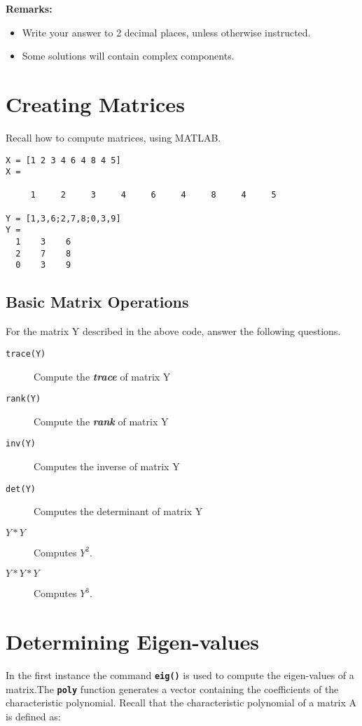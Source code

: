 \documentclass[a4paper,12pt]{article}
\begin{document}
\tableofcontents
\newpage


\textbf{Remarks:}
\begin{itemize}
\item Write your answer to 2 decimal places, unless otherwise instructed.
\item Some solutions will contain complex components.
\end{itemize}


\section{Creating Matrices}
Recall how to compute matrices, using MATLAB.

\begin{framed}
\begin{verbatim}
X = [1 2 3 4 6 4 8 4 5]
X =

     1     2     3     4     6     4     8     4     5

Y = [1,3,6;2,7,8;0,3,9]
Y =
  1    3    6
  2    7    8
  0    3    9

\end{verbatim}
\end{framed}

\subsection{Basic Matrix Operations}

For the matrix Y described in the above code, answer the following questions.
\begin{description}
\item[\texttt{trace(Y)}] Compute the \textbf{\textit{trace}} of matrix Y
\item[\texttt{rank(Y)}] Compute the \textbf{\textit{rank}} of matrix Y
\item[\texttt{inv(Y)}] Computes the inverse of matrix Y
\item[\texttt{det(Y)}] Computes the determinant of matrix Y
\item[\texttt{$Y * Y$}] Computes $Y^2$.
\item[\texttt{$Y*Y*Y$}] Computes $Y^3$.
\end{description}

\section{Determining Eigen-values}
In the first instance the command \texttt{\textbf{eig()}} is used to compute the eigen-values of a matrix.The \texttt{\textbf{poly}} function generates a vector containing the coefficients of the characteristic polynomial. Recall that the characteristic polynomial of a matrix A is defined as:
\end{document}

